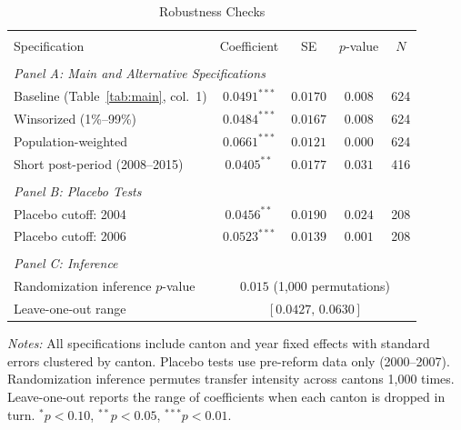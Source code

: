 \begin{table}[t]
\centering
\caption{Robustness Checks}
\label{tab:robustness}
\small
\begin{threeparttable}
\begin{tabular}{lcccc}
\hline\hline
\\[-1.8ex]
Specification & Coefficient & SE & $p$-value & $N$ \\
\hline
\\[-1.8ex]
\multicolumn{5}{l}{\textit{Panel A: Main and Alternative Specifications}} \\[3pt]
Baseline (Table~\ref{tab:main}, col.\ 1) & $0.0491^{***}$ & $0.0170$ & $0.008$ & 624 \\
Winsorized (1\%--99\%) & $0.0484^{***}$ & $0.0167$ & $0.008$ & 624 \\
Population-weighted & $0.0661^{***}$ & $0.0121$ & $0.000$ & 624 \\
Short post-period (2008--2015) & $0.0405^{**}$ & $0.0177$ & $0.031$ & 416 \\
\\[6pt]
\multicolumn{5}{l}{\textit{Panel B: Placebo Tests}} \\[3pt]
Placebo cutoff: 2004 & $0.0456^{**}$ & $0.0190$ & $0.024$ & 208 \\
Placebo cutoff: 2006 & $0.0523^{***}$ & $0.0139$ & $0.001$ & 208 \\
\\[6pt]
\multicolumn{5}{l}{\textit{Panel C: Inference}} \\[3pt]
Randomization inference $p$-value & \multicolumn{4}{c}{$0.015$ (1{,}000 permutations)} \\
Leave-one-out range & \multicolumn{4}{c}{$[0.0427,\, 0.0630]$} \\
\hline\hline
\end{tabular}
\begin{tablenotes}
\item \textit{Notes:} All specifications include canton and year fixed effects with standard errors clustered by canton. Placebo tests use pre-reform data only (2000--2007). Randomization inference permutes transfer intensity across cantons 1{,}000 times. Leave-one-out reports the range of coefficients when each canton is dropped in turn. $^{*}p<0.10$, $^{**}p<0.05$, $^{***}p<0.01$.
\end{tablenotes}
\end{threeparttable}
\end{table}
